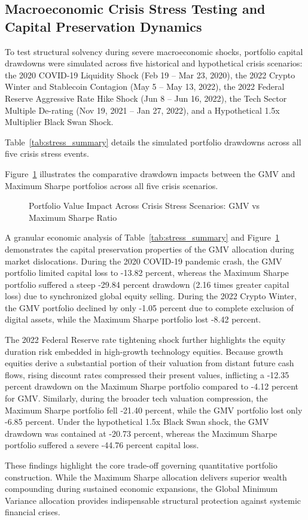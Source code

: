 \subsection{Macroeconomic Crisis Stress Testing and Capital Preservation Dynamics}

To test structural solvency during severe macroeconomic shocks, portfolio capital drawdowns were simulated across five historical and hypothetical crisis scenarios: the 2020 COVID-19 Liquidity Shock (Feb 19 -- Mar 23, 2020), the 2022 Crypto Winter and Stablecoin Contagion (May 5 -- May 13, 2022), the 2022 Federal Reserve Aggressive Rate Hike Shock (Jun 8 -- Jun 16, 2022), the Tech Sector Multiple De-rating (Nov 19, 2021 -- Jan 27, 2022), and a Hypothetical 1.5x Multiplier Black Swan Shock.

Table~\ref{tab:stress_summary} details the simulated portfolio drawdowns across all five crisis stress events.



Figure~\ref{fig:stress_test} illustrates the comparative drawdown impacts between the GMV and Maximum Sharpe portfolios across all five crisis scenarios.

\begin{figure}[H]
  \centering
  \caption{Portfolio Value Impact Across Crisis Stress Scenarios: GMV vs Maximum Sharpe Ratio}
  \label{fig:stress_test}
\end{figure}

A granular economic analysis of Table~\ref{tab:stress_summary} and Figure~\ref{fig:stress_test} demonstrates the capital preservation properties of the GMV allocation during market dislocations. During the 2020 COVID-19 pandemic crash, the GMV portfolio limited capital loss to -13.82 percent, whereas the Maximum Sharpe portfolio suffered a steep -29.84 percent drawdown (2.16 times greater capital loss) due to synchronized global equity selling. During the 2022 Crypto Winter, the GMV portfolio declined by only -1.05 percent due to complete exclusion of digital assets, while the Maximum Sharpe portfolio lost -8.42 percent.

The 2022 Federal Reserve rate tightening shock further highlights the equity duration risk embedded in high-growth technology equities. Because growth equities derive a substantial portion of their valuation from distant future cash flows, rising discount rates compressed their present values, inflicting a -12.35 percent drawdown on the Maximum Sharpe portfolio compared to -4.12 percent for GMV. Similarly, during the broader tech valuation compression, the Maximum Sharpe portfolio fell -21.40 percent, while the GMV portfolio lost only -6.85 percent. Under the hypothetical 1.5x Black Swan shock, the GMV drawdown was contained at -20.73 percent, whereas the Maximum Sharpe portfolio suffered a severe -44.76 percent capital loss.

These findings highlight the core trade-off governing quantitative portfolio construction. While the Maximum Sharpe allocation delivers superior wealth compounding during sustained economic expansions, the Global Minimum Variance allocation provides indispensable structural protection against systemic financial crises.
